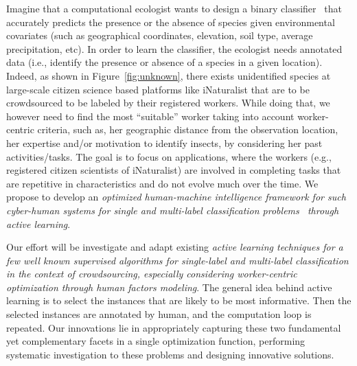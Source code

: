 Imagine that a computational ecologist wants to design a binary classifier~\cite{garzon2006predicting} that accurately predicts the presence or the absence of species given environmental covariates (such as geographical coordinates, elevation, soil type, average precipitation, etc). In order to learn the classifier, the ecologist needs annotated data (i.e., identify the presence or absence of a species in a given location). Indeed, as shown in Figure~\ref{fig:unknown}, there exists unidentified species at large-scale citizen science based platforms like iNaturalist that are to be crowdsourced to be labeled by their registered workers. While doing that, we however need to find the most ``suitable'' worker  taking into account worker-centric criteria, such as, her geographic distance from the observation location, her expertise and/or motivation to identify insects, by considering her past activities/tasks. The goal is to focus on applications, where the workers (e.g., registered citizen scientists of iNaturalist) are involved in completing tasks that are repetitive in characteristics and do not evolve much over the time. We propose to develop an {\em optimized human-machine intelligence framework for such cyber-human systems for single and multi-label classification problems~\cite{single1,multi0} through active learning}. 

Our effort will be investigate and adapt existing {\em active learning techniques for a few well known supervised algorithms for single-label and multi-label classification in the context of crowdsourcing, especially considering worker-centric optimization through human factors modeling}. The general idea behind active learning is to select the instances that are likely to be most informative. Then the selected instances are annotated by human, and the computation loop is repeated.  Our innovations lie in appropriately capturing these two fundamental yet complementary facets in a single optimization function, performing systematic investigation to these problems and designing innovative solutions. 



